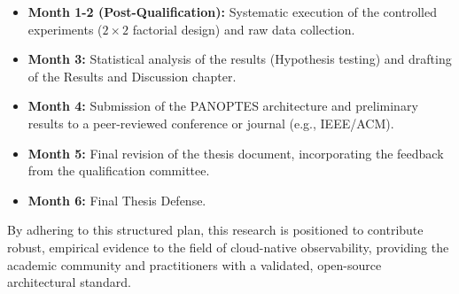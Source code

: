 \begin{itemize}
    \item \textbf{Month 1-2 (Post-Qualification):} Systematic execution of the controlled experiments ($2\times2$ factorial design) and raw data collection.
    \item \textbf{Month 3:} Statistical analysis of the results (Hypothesis testing) and drafting of the Results and Discussion chapter.
    \item \textbf{Month 4:} Submission of the PANOPTES architecture and preliminary results to a peer-reviewed conference or journal (e.g., IEEE/ACM).
    \item \textbf{Month 5:} Final revision of the thesis document, incorporating the feedback from the qualification committee.
    \item \textbf{Month 6:} Final Thesis Defense.
\end{itemize}

By adhering to this structured plan, this research is positioned to contribute robust, empirical evidence to the field of cloud-native observability, providing the academic community and practitioners with a validated, open-source architectural standard.